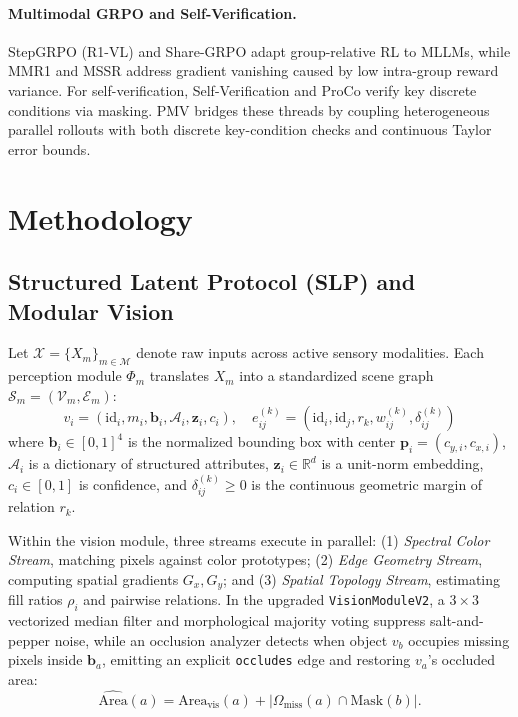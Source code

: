 \documentclass[10pt,twocolumn]{article}
\begin{document}
\paragraph{Multimodal GRPO and Self-Verification.}
StepGRPO (R1-VL) \cite{r1vl2025} and Share-GRPO \cite{sharegrpo2025} adapt group-relative RL to MLLMs, while MMR1 \cite{leng2026mmr1} and MSSR \cite{liu2026mssr} address gradient vanishing caused by low intra-group reward variance. For self-verification, Self-Verification \cite{weng2023self} and ProCo \cite{wu2024proco} verify key discrete conditions via masking. PMV bridges these threads by coupling heterogeneous parallel rollouts with both discrete key-condition checks and continuous Taylor error bounds.

\section{Methodology}

\subsection{Structured Latent Protocol (SLP) and Modular Vision}
Let $\mathcal{X} = \{X_m\}_{m \in \mathcal{M}}$ denote raw inputs across active sensory modalities. Each perception module $\Phi_m$ translates $X_m$ into a standardized scene graph $\mathcal{S}_m = (\mathcal{V}_m, \mathcal{E}_m)$:
\begin{equation}
    v_i = (\text{id}_i, m_i, \mathbf{b}_i, \mathcal{A}_i, \mathbf{z}_i, c_i), \quad
    e_{ij}^{(k)} = (\text{id}_i, \text{id}_j, r_k, w_{ij}^{(k)}, \delta_{ij}^{(k)})
\end{equation}
where $\mathbf{b}_i \in [0,1]^4$ is the normalized bounding box with center $\mathbf{p}_i = (c_{y,i}, c_{x,i})$, $\mathcal{A}_i$ is a dictionary of structured attributes, $\mathbf{z}_i \in \mathbb{R}^d$ is a unit-norm embedding, $c_i \in [0,1]$ is confidence, and $\delta_{ij}^{(k)} \ge 0$ is the continuous geometric margin of relation $r_k$.

Within the vision module, three streams execute in parallel: (1) \emph{Spectral Color Stream}, matching pixels against color prototypes; (2) \emph{Edge Geometry Stream}, computing spatial gradients $G_x, G_y$; and (3) \emph{Spatial Topology Stream}, estimating fill ratios $\rho_i$ and pairwise relations. In the upgraded \texttt{VisionModuleV2}, a $3\times 3$ vectorized median filter and morphological majority voting suppress salt-and-pepper noise, while an occlusion analyzer detects when object $v_b$ occupies missing pixels inside $\mathbf{b}_a$, emitting an explicit \texttt{occludes} edge and restoring $v_a$'s occluded area:
\begin{equation}
    \widehat{\text{Area}}(a) = \text{Area}_{\text{vis}}(a) + |\Omega_{\text{miss}}(a) \cap \text{Mask}(b)|.
\end{equation}
\end{document}
